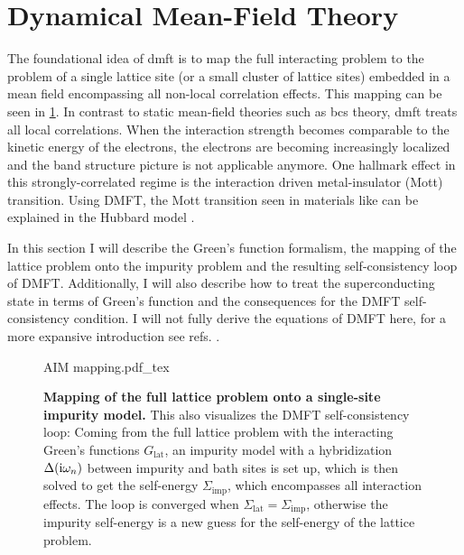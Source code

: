\documentclass[../main.tex]{subfiles}
\begin{document}
\section{Dynamical Mean-Field Theory}\label{sec:Dynamical Mean-Field Theory}

The foundational idea of \gls{dmft} is to map the full interacting problem to the problem of a single lattice site (or a small cluster of lattice sites) embedded in a mean field encompassing all non-local correlation effects.
This mapping can be seen in \cref{fig:DMFT AIM mapping}.
In contrast to static mean-field theories such as \gls{bcs} theory, \gls{dmft} treats all local correlations.
When the interaction strength becomes comparable to the kinetic energy of the electrons, the electrons are becoming increasingly localized and the band structure picture is not applicable anymore.
One hallmark effect in this strongly-correlated regime is the interaction driven metal-insulator (Mott) transition.
Using DMFT, the Mott transition seen in materials like  \cite{mcwhanMottTransitionCrDoped1969} can be explained in the Hubbard model \cite{rozenbergMottHubbardTransitionInfinite1994}.

In this section I will describe the Green's function formalism, the mapping of the lattice problem onto the impurity problem and the resulting self-consistency loop of DMFT.
Additionally, I will also describe how to treat the superconducting state in terms of Green's function and the consequences for the DMFT self-consistency condition.
I will not fully derive the equations of DMFT here, for a more expansive introduction see refs. \cite{pavariniDynamicalMeanfieldTheory2022, georgesDynamicalMeanfieldTheory1996, colemanIntroductionManyBodyPhysics2015, bruusManyBodyQuantumTheory2004}.

\begin{figure}[t]
	\centering
	{AIM mapping.pdf_tex}
	\caption[Mapping of the full lattice problem onto a single-site impurity model.]{
		\textbf{Mapping of the full lattice problem onto a single-site impurity model.} This also visualizes the DMFT self-consistency loop: Coming from the full lattice problem with the interacting Green's functions \(G_{\mathrm{lat}}\), an impurity model with a hybridization \(\Delta (\mathrm{i} \omega_n)\) between impurity and bath sites  is set up, which is then solved to get the self-energy \(\Sigma_{\mathrm{imp}}\), which encompasses all interaction effects. The loop is converged when \(\Sigma_{\mathrm{lat}} = \Sigma_{\mathrm{imp}}\), otherwise the impurity self-energy is a new guess for the self-energy of the lattice problem.
	}
	\label{fig:DMFT AIM mapping}
\end{figure}
\end{document}
